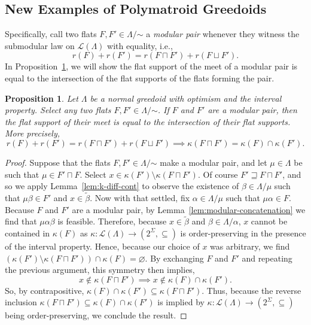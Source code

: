 \documentclass[11pt]{article}
\newtheorem{proposition}[theorem]{Proposition}
\newcommand{\univ}{\Sigma}
\newcommand{\glang}{\Lambda}
\providecommand{\L}{}
\renewcommand{\L}{\mathscr{L}}
\begin{document}
\subsection{New Examples of Polymatroid Greedoids}\label{subsec:new-pm-greedoids}
Specifically, call two flats $F,F'\in\glang/\mathord{\sim}$ a \emph{modular pair} whenever they witness the submodular law on $\L(\glang)$ with equality, i.e.,
\[
    r(F) + r(F') = r(F\sqcap F') + r(F\sqcup F').
\]
In Proposition~\ref{prop:mod-k-closed}, we will show the flat support of the meet of a modular pair is equal to the intersection of the flat supports of the flats forming the pair.
\begin{proposition}\label{prop:mod-k-closed}
    Let $\glang$ be a normal greedoid with optimism and the interval property.
    Select any two flats $F, F'\in\glang/\mathord{\sim}$.
    If $F$ and $F'$ are a modular pair, then the flat support of their meet is equal to the intersection of their flat supports.
    More precisely,
    \[
        r(F)+r(F') = r(F\sqcap F') + r(F\sqcup F') \implies \kappa(F\sqcap F') = \kappa(F) \cap \kappa(F').
    \]
\end{proposition}
\begin{proof}
    Suppose that the flats $F, F' \in \glang/\mathord{\sim}$ make a modular pair, and let $\mu \in\glang$ be such that $\mu \in F'\sqcap F$.
    Select $x \in \kappa(F')\setminus\kappa(F\sqcap F')$.
    Of course $F'\sqsupseteq F\sqcap F'$, and so we apply Lemma~\ref{lem:k-diff-cont} to observe the existence of $\beta \in \glang/\mu$ such that $\mu\beta \in F'$ and $x \in \widetilde{\beta}$.
    Now with that settled, fix $\alpha \in \glang/\mu$ such that $\mu\alpha \in F$.
    Because $F$ and $F'$ are a modular pair, by Lemma~\ref{lem:modular-concatenation} we find that $\mu\alpha\beta$ is feasible.
    Therefore, because $x \in \widetilde{\beta}$ and $\beta \in \glang/\alpha$, $x$ cannot be contained in $\kappa(F)$ as $\kappa:\L(\glang)\to\left(2^\univ,\subseteq\right)$ is order-preserving in the presence of the interval property.
    Hence, because our choice of $x$ was arbitrary, we find $\left(\kappa(F')\setminus\kappa(F\sqcap F')\right)\cap \kappa(F) = \varnothing$.
    By exchanging $F$ and $F'$ and repeating the previous argument, this symmetry then implies,
    \[
        x \notin \kappa(F\sqcap F') \implies x \notin \kappa(F)\cap\kappa(F').
    \]
    So, by contrapositive, $\kappa(F)\cap\kappa(F') \subseteq \kappa(F\sqcap F')$.
    Thus, because the reverse inclusion $\kappa(F\sqcap F') \subseteq \kappa(F)\cap\kappa(F')$ is implied by $\kappa:\L(\glang)\to\left(2^\univ,\subseteq\right)$ being order-preserving, we conclude the result.
\end{proof}
\end{document}
